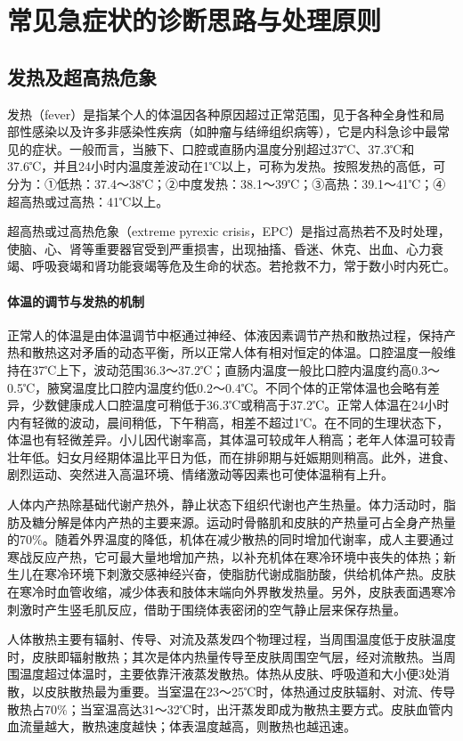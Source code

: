 \part{常见急症状的诊断思路与处理原则}

\chapter{发热及超高热危象}

发热（fever）是指某个人的体温因各种原因超过正常范围，见于各种全身性和局部性感染以及许多非感染性疾病（如肿瘤与结缔组织病等），它是内科急诊中最常见的症状。一般而言，当腋下、口腔或直肠内温度分别超过37℃、37.3℃和37.6℃，并且24小时内温度差波动在1℃以上，可称为发热。按照发热的高低，可分为：①低热：37.4～38℃；②中度发热：38.1～39℃；③高热：39.1～41℃；④超高热或过高热：41℃以上。

超高热或过高热危象（extreme pyrexic
crisis，EPC）是指过高热若不及时处理，使脑、心、肾等重要器官受到严重损害，出现抽搐、昏迷、休克、出血、心力衰竭、呼吸衰竭和肾功能衰竭等危及生命的状态。若抢救不力，常于数小时内死亡。

\subsection{体温的调节与发热的机制}

正常人的体温是由体温调节中枢通过神经、体液因素调节产热和散热过程，保持产热和散热这对矛盾的动态平衡，所以正常人体有相对恒定的体温。口腔温度一般维持在37℃上下，波动范围36.3～37.2℃；直肠内温度一般比口腔内温度约高0.3～0.5℃，腋窝温度比口腔内温度约低0.2～0.4℃。不同个体的正常体温也会略有差异，少数健康成人口腔温度可稍低于36.3℃或稍高于37.2℃。正常人体温在24小时内有轻微的波动，晨间稍低，下午稍高，相差不超过1℃。在不同的生理状态下，体温也有轻微差异。小儿因代谢率高，其体温可较成年人稍高；老年人体温可较青壮年低。妇女月经期体温比平日为低，而在排卵期与妊娠期则稍高。此外，进食、剧烈运动、突然进入高温环境、情绪激动等因素也可使体温稍有上升。

人体内产热除基础代谢产热外，静止状态下组织代谢也产生热量。体力活动时，脂肪及糖分解是体内产热的主要来源。运动时骨骼肌和皮肤的产热量可占全身产热量的70\%。随着外界温度的降低，机体在减少散热的同时增加代谢率，成人主要通过寒战反应产热，它可最大量地增加产热，以补充机体在寒冷环境中丧失的体热；新生儿在寒冷环境下刺激交感神经兴奋，使脂肪代谢成脂肪酸，供给机体产热。皮肤在寒冷时血管收缩，减少体表和肢体末端向外界散发热量。另外，皮肤表面遇寒冷刺激时产生竖毛肌反应，借助于围绕体表密闭的空气静止层来保存热量。

人体散热主要有辐射、传导、对流及蒸发四个物理过程，当周围温度低于皮肤温度时，皮肤即辐射散热；其次是体内热量传导至皮肤周围空气层，经对流散热。当周围温度超过体温时，主要依靠汗液蒸发散热。体热从皮肤、呼吸道和大小便3处消散，以皮肤散热最为重要。当室温在23～25℃时，体热通过皮肤辐射、对流、传导散热占70\%；当室温高达31～32℃时，出汗蒸发即成为散热主要方式。皮肤血管内血流量越大，散热速度越快；体表温度越高，则散热也越迅速。

